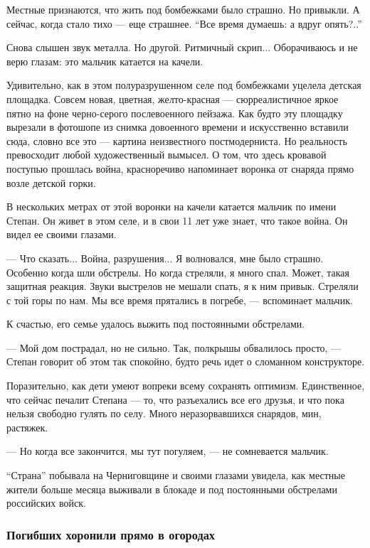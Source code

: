 Местные признаются, что жить под бомбежками было страшно. Но привыкли. А
сейчас, когда стало тихо — еще страшнее. \enquote{Все время думаешь: а вдруг опять?..}

Снова слышен звук металла. Но другой. Ритмичный скрип... Оборачиваюсь и не верю
глазам: это мальчик катается на качели. 

Удивительно, как в этом полуразрушенном селе под бомбежками уцелела детская
площадка. Совсем новая, цветная, желто-красная — сюрреалистичное яркое пятно на
фоне черно-серого послевоенного пейзажа. Как будто эту площадку вырезали в
фотошопе из снимка довоенного времени и искусственно вставили сюда, словно все
это — картина неизвестного постмодерниста. Но реальность превосходит любой
художественный вымысел. О том, что здесь кровавой поступью прошлась война,
красноречиво напоминает воронка от снаряда прямо возле детской горки. 


В нескольких метрах от этой воронки на качели катается мальчик по имени Степан.
Он живет в этом селе, и в свои 11 лет уже знает, что такое война. Он видел ее
своими глазами. 

— Что сказать... Война, разрушения... Я волновался, мне было страшно. Особенно
когда шли обстрелы. Но когда стреляли, я много спал. Может, такая защитная
реакция. Звуки выстрелов не мешали спать, я к ним привык. Стреляли с той горы
по нам. Мы все время прятались в погребе, — вспоминает мальчик. 

К счастью, его семье удалось выжить под постоянными обстрелами. 

— Мой дом пострадал, но не сильно. Так, полкрышы обвалилось просто, — Степан
говорит об этом так спокойно, будто речь идет о сломанном конструкторе. 

Поразительно, как дети умеют вопреки всему сохранять оптимизм. Единственное,
что сейчас печалит Степана — то, что разъехались все его друзья, и что пока
нельзя свободно гулять по селу. Много неразорвавшихся снарядов, мин, растяжек. 

— Но когда все закончится, мы тут погуляем, — не сомневается мальчик.

\enquote{Страна} побывала на Черниговщине и своими глазами увидела, как местные жители
больше месяца выживали в блокаде и под постоянными обстрелами российских войск. 

\subsubsection{Погибших хоронили прямо в огородах}

